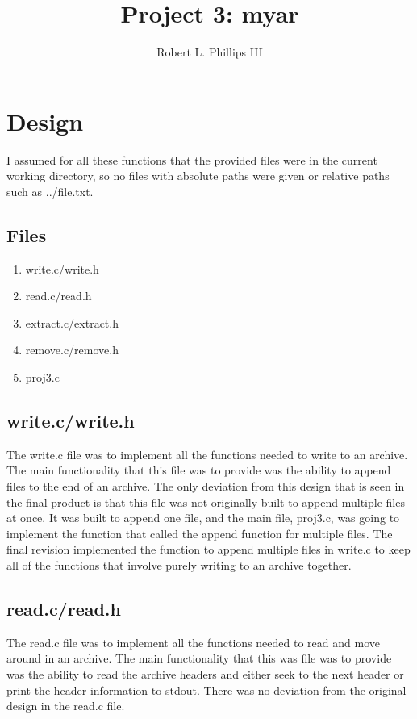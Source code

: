 \documentclass{article}
\begin{document}
\title{Project 3:  myar}
\author{Robert L. Phillips III}
\maketitle
\newpage
\tableofcontents
\newpage

\section{Design}
I assumed for all these functions that the provided files were in the current working directory, so no files with absolute paths were given or relative paths such as ../file.txt. \\
\subsection{Files}
\begin{enumerate}
\item write.c/write.h
\item read.c/read.h
\item extract.c/extract.h
\item remove.c/remove.h
\item proj3.c
\end{enumerate}
\subsection{write.c/write.h}
The write.c file was to implement all the functions needed to write to an archive.  The main functionality that this file was to provide was the ability to append files to the end of an archive.  The only deviation from this design that is seen in the final product is that this file was not originally built to append multiple files at once.  It was built to append one file, and the main file, proj3.c, was going to implement the function that called the append function for multiple files.  The final revision implemented the function to append multiple files in write.c to keep all of the functions that involve purely writing to an archive together.
\subsection{read.c/read.h}
The read.c file was to implement all the functions needed to read and move around in an archive.  The main functionality that this was file was to provide was the ability to read the archive headers and either seek to the next header or print the header information to stdout.  There was no deviation from the original design in the read.c file.
\end{document}

